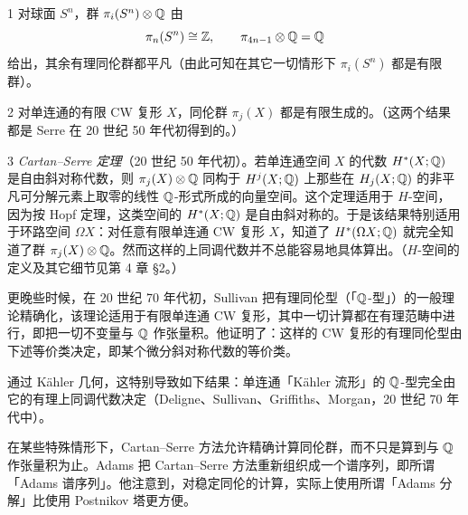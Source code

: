 \begin{example*}{1}
对球面 $S^n$，群 $\pi_i(S^n)\otimes\mathbb{Q}$ 由
\[
\pi_n(S^n)\cong\mathbb{Z},\qquad \pi_{4n-1}\otimes\mathbb{Q}=\mathbb{Q}
\]
给出，其余有理同伦群都平凡（由此可知在其它一切情形下 $\pi_i(S^n)$ 都是有限群）。
\end{example*}

\begin{example*}{2}
对单连通的有限 CW 复形 $X$，同伦群 $\pi_j(X)$ 都是有限生成的。（这两个结果都是 Serre 在 20 世纪 50 年代初得到的。）
\end{example*}

\begin{example*}{3}
\emph{Cartan--Serre 定理}（20 世纪 50 年代初）。若单连通空间 $X$ 的代数 $H^*(X;\mathbb{Q})$ 是自由斜对称代数，则 $\pi_j(X)\otimes\mathbb{Q}$ 同构于 $H^j(X;\mathbb{Q})$ 上那些在 $H_j(X;\mathbb{Q})$ 的非平凡可分解元素上取零的线性 $\mathbb{Q}$-形式所成的向量空间。这个定理适用于 $H$-空间，因为按 Hopf 定理，这类空间的 $H^*(X;\mathbb{Q})$ 是自由斜对称的。于是该结果特别适用于环路空间 $\Omega X$：对任意有限单连通 CW 复形 $X$，知道了 $H^*(\Omega X;\mathbb{Q})$ 就完全知道了群 $\pi_j(X)\otimes\mathbb{Q}$。然而这样的上同调代数并不总能容易地具体算出。（$H$-空间的定义及其它细节见第 4 章 §2。）
\end{example*}

更晚些时候，在 20 世纪 70 年代初，Sullivan 把有理同伦型（「$\mathbb{Q}$-型」）的一般理论精确化，该理论适用于有限单连通 CW 复形，其中一切计算都在有理范畴中进行，即把一切不变量与 $\mathbb{Q}$ 作张量积。他证明了：这样的 CW 复形的有理同伦型由下述等价类决定，即某个微分斜对称代数的等价类。

通过 Kähler 几何，这特别导致如下结果：单连通「Kähler 流形」的 $\mathbb{Q}$-型完全由它的有理上同调代数决定（Deligne、Sullivan、Griffiths、Morgan，20 世纪 70 年代中）。

在某些特殊情形下，Cartan--Serre 方法允许精确计算同伦群，而不只是算到与 $\mathbb{Q}$ 作张量积为止。Adams 把 Cartan--Serre 方法重新组织成一个谱序列，即所谓「Adams 谱序列」。他注意到，对稳定同伦的计算，实际上使用所谓「Adams 分解」比使用 Postnikov 塔更方便。

